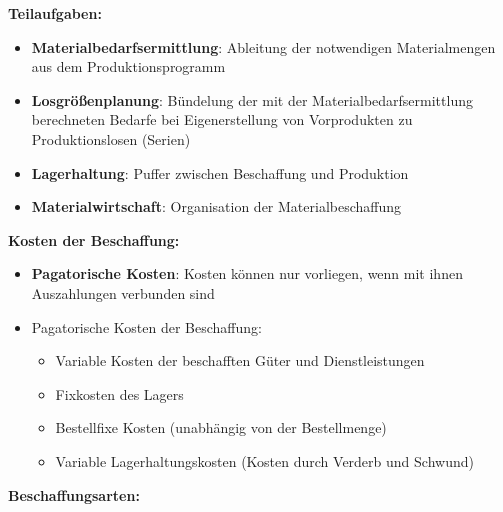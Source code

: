 \textbf{Teilaufgaben:}
\begin{itemize}
	\item \textbf{Materialbedarfsermittlung}: Ableitung der notwendigen Materialmengen aus dem Produktionsprogramm
	\item \textbf{Losgrößenplanung}: Bündelung der mit der Materialbedarfsermittlung berechneten Bedarfe bei Eigenerstellung von Vorprodukten zu Produktionslosen (Serien)
	\item \textbf{Lagerhaltung}: Puffer zwischen Beschaffung und Produktion
	\item \textbf{Materialwirtschaft}: Organisation der Materialbeschaffung
\end{itemize}
\bigskip
\textbf{Kosten der Beschaffung:}
\begin{itemize}
	\item \textbf{Pagatorische Kosten}: Kosten können nur vorliegen, wenn mit ihnen Auszahlungen verbunden sind
	\item Pagatorische Kosten der Beschaffung:
	\begin{itemize}
		\item Variable Kosten der beschafften Güter und Dienstleistungen
		\item Fixkosten des Lagers
		\item Bestellfixe Kosten (unabhängig von der Bestellmenge)
		\item Variable Lagerhaltungskosten (Kosten durch Verderb und Schwund)
	\end{itemize}
\end{itemize}
\bigskip
\textbf{Beschaffungsarten:}
